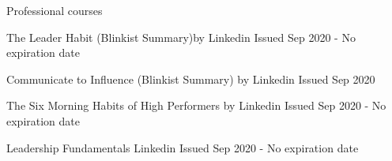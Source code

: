 \begin{cventries}
  \cventry
    {Professional courses}
     {}
     {}
     {}
    {
      \begin{cvitems}
        \item {The Leader Habit (Blinkist Summary)by Linkedin Issued Sep 2020 - No expiration date}
        \item {Communicate to Influence (Blinkist Summary) by Linkedin Issued Sep 2020 }
        \item {The Six Morning Habits of High Performers by Linkedin Issued Sep 2020 - No expiration date}
        \item {Leadership Fundamentals Linkedin Issued Sep 2020 - No expiration date}
     \end{cvitems}
    }
 \end{cventries} 